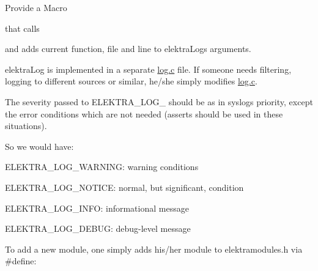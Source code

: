 Provide a Macro


\begin{DoxyCode}{0}
\end{DoxyCode}


that calls


\begin{DoxyCode}{0}
\end{DoxyCode}


and adds current function, file and line to {\ttfamily elektra\+Log}\textquotesingle{}s arguments.

{\ttfamily elektra\+Log} is implemented in a separate {\ttfamily \mbox{\hyperlink{log_8c}{log.\+c}}} file. If someone needs filtering, logging to different sources or similar, he/she simply modifies {\ttfamily \mbox{\hyperlink{log_8c}{log.\+c}}}.

The severity passed to {\ttfamily E\+L\+E\+K\+T\+R\+A\+\_\+\+L\+O\+G\+\_\+} should be as in syslog\textquotesingle{}s priority, except the error conditions which are not needed (asserts should be used in these situations).

So we would have\+:


\begin{DoxyItemize}
\item {\ttfamily E\+L\+E\+K\+T\+R\+A\+\_\+\+L\+O\+G\+\_\+\+W\+A\+R\+N\+I\+NG}\+: warning conditions
\item {\ttfamily E\+L\+E\+K\+T\+R\+A\+\_\+\+L\+O\+G\+\_\+\+N\+O\+T\+I\+CE}\+: normal, but significant, condition
\item {\ttfamily E\+L\+E\+K\+T\+R\+A\+\_\+\+L\+O\+G\+\_\+\+I\+N\+FO}\+: informational message
\item {\ttfamily E\+L\+E\+K\+T\+R\+A\+\_\+\+L\+O\+G\+\_\+\+D\+E\+B\+UG}\+: debug-\/level message
\end{DoxyItemize}

To add a new module, one simply adds his/her module to {\ttfamily elektramodules.\+h} via {\ttfamily \#define}\+:


\begin{DoxyCode}{0}
\DoxyCodeLine{\textcolor{preprocessor}{\#define ELEKTRA\_MODULE\_<NAME> <SEQNUMBER>}}
\end{DoxyCode}


